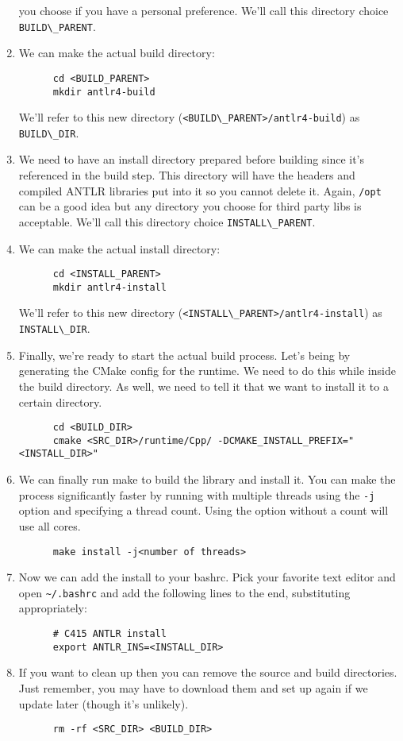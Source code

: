 \documentclass{article}
\begin{document}
\begin{enumerate}
    you choose if you have a personal preference. We'll call this directory choice
    \lstinline{BUILD\_PARENT}.
  \item
    We can make the actual build directory:
    \begin{lstlisting}
      cd <BUILD_PARENT>
      mkdir antlr4-build
    \end{lstlisting}
    We'll refer to this new directory (\lstinline{<BUILD\_PARENT>/antlr4-build}) as
    \lstinline{BUILD\_DIR}.
  \item
    We need to have an install directory prepared before building since it's referenced in the
    build step. This directory will have the headers and compiled ANTLR libraries put into it so
    you cannot delete it. Again, \lstinline{/opt} can be a good idea but any directory you choose
    for third party libs is acceptable. We'll call this directory choice
    \lstinline{INSTALL\_PARENT}.
  \item
    We can make the actual install directory:
    \begin{lstlisting}
      cd <INSTALL_PARENT>
      mkdir antlr4-install
    \end{lstlisting}
    We'll refer to this new directory (\lstinline{<INSTALL\_PARENT>/antlr4-install}) as
    \lstinline{INSTALL\_DIR}.
  \item
    Finally, we're ready to start the actual build process. Let's being by generating the CMake
    config for the runtime. We need to do this while inside the build directory. As well, we need
    to tell it that we want to install it to a certain directory.
    \begin{lstlisting}
      cd <BUILD_DIR>
      cmake <SRC_DIR>/runtime/Cpp/ -DCMAKE_INSTALL_PREFIX="<INSTALL_DIR>"
    \end{lstlisting}
  \item
    We can finally run make to build the library and install it. You can make the process
    significantly faster by running with multiple threads using the \lstinline{-j} option and
    specifying a thread count. Using the option without a count will use all cores.
    \begin{lstlisting}
      make install -j<number of threads>
    \end{lstlisting}
  \item
    Now we can add the install to your bashrc. Pick your favorite text editor and open
    \lstinline{~/.bashrc} and add the following lines to the end, substituting appropriately:
    \begin{lstlisting}
      # C415 ANTLR install
      export ANTLR_INS=<INSTALL_DIR>
    \end{lstlisting}
  \item
    If you want to clean up then you can remove the source and build directories. Just remember,
    you may have to download them and set up again if we update later (though it's unlikely).
    \begin{lstlisting}
      rm -rf <SRC_DIR> <BUILD_DIR>
    \end{lstlisting}
\end{enumerate}
\end{document}
